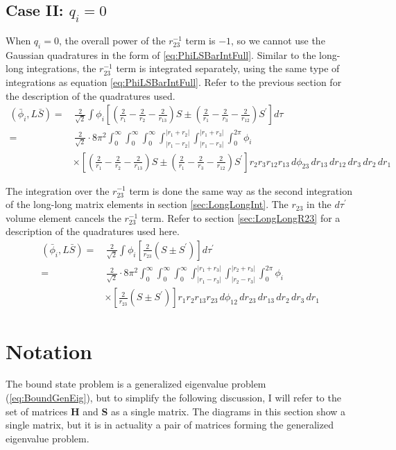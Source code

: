 \documentclass[Dissertation.tex]{subfiles}
\begin{document}
\subsection{Case II: \texorpdfstring{$q_i = 0$}{qi = 0}}
When $q_i = 0$, the overall power of the $r_{23}^{-1}$ term is $-1$, so we cannot use the Gaussian quadratures in the form of \ref{eq:PhiLSBarIntFull}.  Similar to the long-long integrations, the $r_{23}^{-1}$ term is integrated separately, using the same type of integrations as equation \ref{eq:PhiLSBarIntFull}.  Refer to the previous section for the description of the quadratures used.
\begin{align}
\label{eq:PhiLSBarIntNoR23}
\nonumber (\bar{\phi}_i, L\bar{S}) =& \,\frac{2}{\sqrt{2}} \int \phi_i \left[ \left( \frac{2}{r_1} - \frac{2}{r_2} - \frac{2}{r_{13}} \right)S \pm \left( \frac{2}{r_1} - \frac{2}{r_3} - \frac{2}{r_{12}} \right) S^\prime \right]  d\tau \\
=&\, \frac{2}{\sqrt{2}} \cdot 8\pi^2  \int_0^\infty \int_0^\infty \int_0^\infty \int_{|r_1 - r_2|}^{|r_1 + r_2|} \int_{|r_1 - r_3|}^{|r_1 + r_3|} \int_0^{2\pi} \phi_i \\
&\times \left[ \left( \frac{2}{r_1} - \frac{2}{r_2} - \frac{2}{r_{13}} \right)S \pm \left( \frac{2}{r_1} - \frac{2}{r_3} - \frac{2}{r_{12}} \right) S^\prime \right]  r_2 r_3 r_{12} r_{13}\, d\phi_{23}\, dr_{13}\, dr_{12}\, dr_3\, dr_2\, dr_1
\end{align}

The integration over the $r_{23}^{-1}$ term is done the same way as the second integration of the long-long matrix elements in section \ref{sec:LongLongInt}.  The $r_{23}$ in the $d\tau^\prime$ volume element cancels the $r_{23}^{-1}$ term.  Refer to section \ref{sec:LongLongR23} for a description of the quadratures used here.
\begin{align}
\label{eq:PhiLSBarIntR23}
\nonumber (\bar{\phi}_i, L\bar{S}) =& \,\frac{2}{\sqrt{2}} \int \phi_i \left[ \frac{2}{r_{23}}\left(S \pm S^\prime\right) \right] d\tau^\prime \\
=&\, \frac{2}{\sqrt{2}} \cdot 8\pi^2  \int_0^\infty \int_0^\infty \int_0^\infty \int_{|r_1 - r_3|}^{|r_1 + r_3|} \int_{|r_2 - r_3|}^{|r_2 + r_3|} \int_0^{2\pi} \phi_i \\
&\times \left[ \frac{2}{r_{23}}\left(S \pm S^\prime\right) \right]  r_1 r_2 r_{13} r_{23}\, d\phi_{12}\, dr_{23}\, dr_{13}\, dr_2\, dr_3\, dr_1
\end{align}

\section{Notation}
\label{sec:CompNotation}
The bound state problem is a generalized eigenvalue problem (\ref{eq:BoundGenEig}), but to simplify the following discussion, I will refer to the set of matrices \textbf{H} and \textbf{S} as a single matrix. The diagrams in this section show a single matrix, but it is in actuality a pair of matrices forming the generalized eigenvalue problem.
\end{document}
